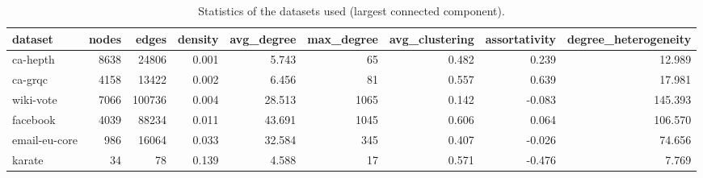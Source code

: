 \begin{table}[t]
\centering
\caption{Statistics of the datasets used (largest connected component).}
\label{tab:table1_graph_stats}
\begin{tabular}{lrrrrrrrr}
\hline
dataset & nodes & edges & density & avg\_degree & max\_degree & avg\_clustering & assortativity & degree\_heterogeneity \\
\hline
ca-hepth & 8638 & 24806 & 0.001 & 5.743 & 65 & 0.482 & 0.239 & 12.989 \\
ca-grqc & 4158 & 13422 & 0.002 & 6.456 & 81 & 0.557 & 0.639 & 17.981 \\
wiki-vote & 7066 & 100736 & 0.004 & 28.513 & 1065 & 0.142 & -0.083 & 145.393 \\
facebook & 4039 & 88234 & 0.011 & 43.691 & 1045 & 0.606 & 0.064 & 106.570 \\
email-eu-core & 986 & 16064 & 0.033 & 32.584 & 345 & 0.407 & -0.026 & 74.656 \\
karate & 34 & 78 & 0.139 & 4.588 & 17 & 0.571 & -0.476 & 7.769 \\
\hline
\end{tabular}
\end{table}